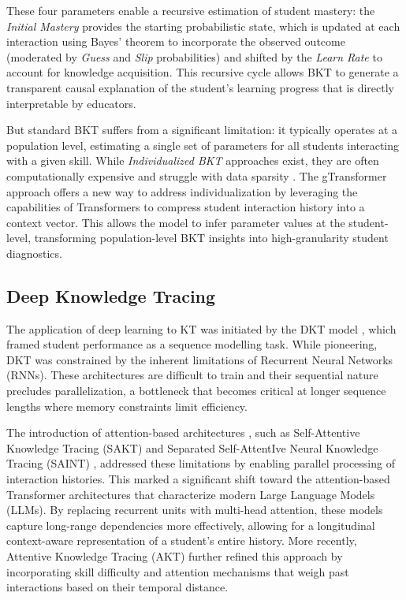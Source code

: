 \documentclass[applsci,article,submit,moreauthors,pdftex]{Definitions/mdpi}
\begin{document}
These four parameters enable a recursive estimation of student mastery: the \textit{Initial Mastery} provides the starting probabilistic state, which is updated at each interaction using Bayes' theorem to incorporate the observed outcome (moderated by \textit{Guess} and \textit{Slip} probabilities) and shifted by the \textit{Learn Rate} to account for knowledge acquisition. This recursive cycle allows BKT to generate a transparent causal explanation of the student's learning progress that is directly interpretable by educators.

But standard BKT suffers from a significant limitation: it typically operates at a population level, estimating a single set of parameters for all students interacting with a given skill. While \textit{Individualized BKT} approaches exist, they are often computationally expensive and struggle with data sparsity \citep{yudelson2013individualised}. The gTransformer approach offers a new way to address individualization by leveraging the capabilities of Transformers to compress student interaction history into a context vector. This allows the model to infer parameter values at the student-level, transforming population-level BKT insights into high-granularity student diagnostics.

\subsection{Deep Knowledge Tracing}

The application of deep learning to KT was initiated by the DKT model \citep{piech2015deep}, which framed student performance as a sequence modelling task. While pioneering, DKT was constrained by the inherent limitations of Recurrent Neural Networks (RNNs). These architectures are difficult to train \citep{Pascanu20132347} and their sequential nature precludes parallelization, a bottleneck that becomes critical at longer sequence lengths where memory constraints limit efficiency. 

The introduction of attention-based architectures \citep{vaswani2017attention}, such as Self-Attentive Knowledge Tracing (SAKT) \citep{Pandey2019384} and Separated Self-AttentIve Neural Knowledge Tracing (SAINT) \citep{choi2020towards}, addressed these limitations by enabling parallel processing of interaction histories. This marked a significant shift toward the attention-based Transformer architectures that characterize modern Large Language Models (LLMs). By replacing recurrent units with multi-head attention, these models capture long-range dependencies more effectively, allowing for a longitudinal context-aware representation of a student's entire history. More recently, Attentive Knowledge Tracing (AKT) \citep{ghosh2020context} further refined this approach by incorporating skill difficulty and attention mechanisms that weigh past interactions based on their temporal distance. 
\end{document}

